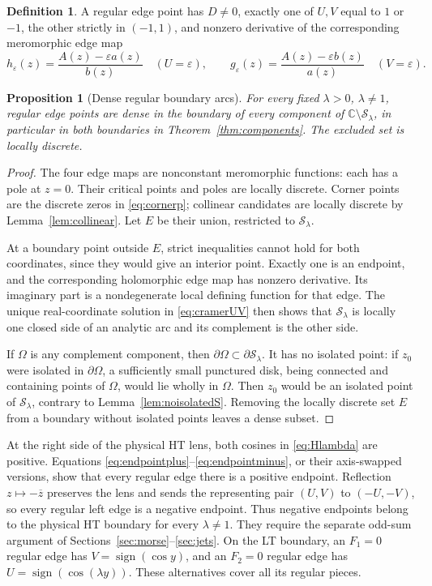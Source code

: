 \documentclass[11pt]{article}
\numberwithin{equation}{section}
\newtheorem{proposition}[theorem]{Proposition}
\theoremstyle{definition}
\newtheorem{definition}[theorem]{Definition}
\newcommand{\C}{\mathbb C}
\newcommand{\eps}{\varepsilon}
\newcommand{\cS}{\mathcal S}
\begin{document}
\begin{definition}\label{def:regularedge}
A regular edge point has \(D\ne0\), exactly one of \(U,V\) equal to
\(1\) or \(-1\), the other strictly in \((-1,1)\), and nonzero
derivative of the corresponding meromorphic edge map
\[
 h_\eps(z)=\frac{A(z)-\eps a(z)}{b(z)}
 \quad(U=\eps),\qquad
 g_\eps(z)=\frac{A(z)-\eps b(z)}{a(z)}
 \quad(V=\eps).
\]
\end{definition}

\begin{proposition}[Dense regular boundary arcs]\label{prop:regular_dense}
For every fixed \(\lambda>0\), \(\lambda\ne1\), regular edge points
are dense in the boundary of every component of
\(\C\setminus\cS_\lambda\), in particular in both boundaries in
Theorem~\ref{thm:components}. The excluded set is locally discrete.
\end{proposition}
\begin{proof}
The four edge maps are nonconstant meromorphic functions: each has a
pole at \(z=0\). Their critical points and poles are locally discrete.
Corner points are the discrete zeros in \eqref{eq:cornerp}; collinear
candidates are locally discrete by Lemma~\ref{lem:collinear}. Let
\(E\) be their union, restricted to \(\cS_\lambda\).

At a boundary point outside \(E\), strict inequalities cannot hold
for both coordinates, since they would give an interior point.
Exactly one is an endpoint, and the corresponding holomorphic edge
map has nonzero derivative. Its imaginary part is a nondegenerate
local defining function for that edge. The unique real-coordinate
solution in \eqref{eq:cramerUV} then shows that \(\cS_\lambda\) is
locally one closed side of an analytic arc and its complement is
the other side.

If \(\Omega\) is any complement component, then
\(\partial\Omega\subset\partial\cS_\lambda\). It has no isolated
point: if \(z_0\) were isolated in \(\partial\Omega\), a sufficiently
small punctured disk, being connected and containing points of
\(\Omega\), would lie wholly in \(\Omega\). Then \(z_0\) would be
an isolated point of \(\cS_\lambda\), contrary to
Lemma~\ref{lem:noisolatedS}. Removing the locally discrete set \(E\)
from a boundary without isolated points leaves a dense subset.
\end{proof}

At the right side of the physical HT lens, both cosines in
\eqref{eq:Hlambda} are positive. Equations
\eqref{eq:endpointplus}--\eqref{eq:endpointminus}, or their axis-swapped
versions, show that every regular edge there is a positive endpoint.
Reflection \(z\mapsto-\overline z\) preserves the lens and sends the
representing pair \((U,V)\) to \((-U,-V)\), so every regular left edge
is a negative endpoint. Thus negative endpoints belong to the physical HT boundary for every
\(\lambda\ne1\). They require the separate odd-sum argument of
Sections~\ref{sec:morse}--\ref{sec:jets}.
On the LT boundary, an \(F_1=0\) regular edge has
\(V=\operatorname{sign}(\cos y)\), and an \(F_2=0\) regular edge has
\(U=\operatorname{sign}(\cos(\lambda y))\). These alternatives cover
all its regular pieces.
\end{document}
